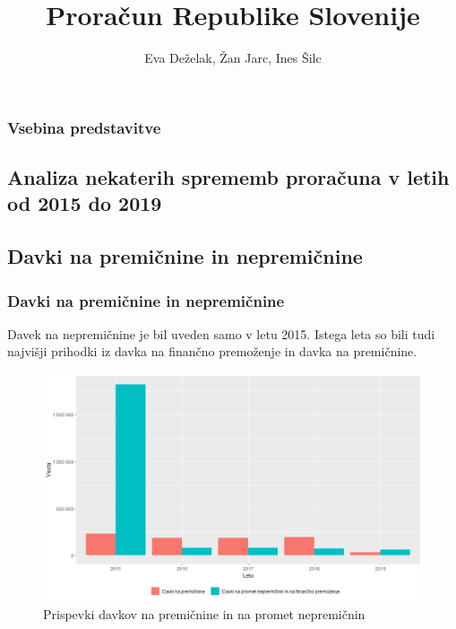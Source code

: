 \documentclass[10pt]{beamer}
\begin{document}
\title[Proračun Republike Slovenije]{Proračun Republike Slovenije}
\author{Eva Deželak, Žan Jarc, Ines Šilc}


\begin{frame}
	\titlepage
\end {frame}

\begin{frame}
	\frametitle{Vsebina predstavitve}
	\tableofcontents
\end {frame}

\begin{frame}
	\section[Analiza nekaterih sprememb proračuna v letih od 2015 do 2019]{Analiza nekaterih sprememb proračuna v letih od 2015 do 2019}
	\subsection[Davki na premičnine in nepremičnine]{Davki na premičnine in nepremičnine}
	\frametitle{Davki na premičnine in nepremičnine}
	Davek na nepremičnine je bil uveden samo v letu 2015. Istega leta so bili tudi najvišji prihodki iz davka na finančno premoženje in davka na premičnine.
	\begin{figure}[h!]
	\centering
	\includegraphics[width = 10 cm]{davki_na_premozenje_graf.png}
	\caption{Prispevki davkov na premičnine in na promet nepremičnin}
	\label{Slika 1}
	\end{figure}
\end {frame}
\end{document}
